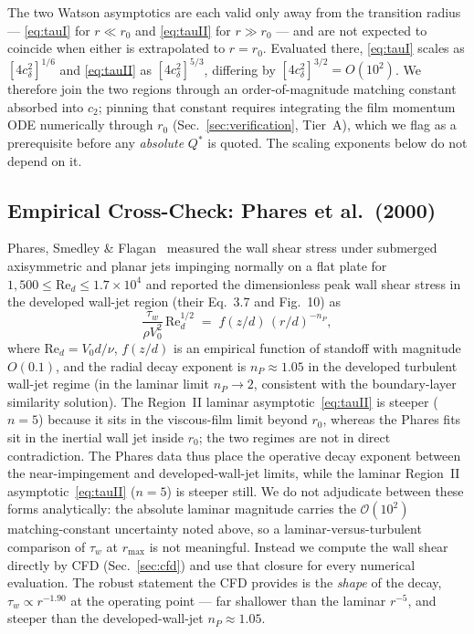 \documentclass[aps,prfluids,reprint,amsmath,amssymb,floatfix]{revtex4-2}
\newcommand{\Rey}{\mathrm{Re}}
\newcommand{\order}[1]{\mathcal{O}\!\left(#1\right)}
\begin{document}
The two Watson asymptotics are each valid only away from the transition radius ---
\eqref{eq:tauI} for $r \ll r_0$ and \eqref{eq:tauII} for $r \gg r_0$ --- and are not
expected to coincide when either is extrapolated to $r = r_0$. Evaluated there,
\eqref{eq:tauI} scales as $[4 c_\delta^2]^{1/6}$ and \eqref{eq:tauII} as
$[4 c_\delta^2]^{5/3}$, differing by $[4 c_\delta^2]^{3/2} = O(10^2)$. We therefore
join the two regions through an order-of-magnitude matching constant absorbed into
$c_2$; pinning that constant requires integrating the film momentum ODE numerically
through $r_0$ (Sec.~\ref{sec:verification}, Tier~A), which we flag as a prerequisite
before any \emph{absolute} $Q^*$ is quoted. The scaling exponents below do not depend
on it.

\subsection{Empirical Cross-Check: Phares et al.~(2000)}

Phares, Smedley \& Flagan~\citep{Phares2000} measured the wall shear
stress under submerged axisymmetric and planar jets impinging normally
on a flat plate for $1{,}500 \leq \Rey_d \leq 1.7\times 10^4$
and reported the dimensionless peak wall shear stress in the developed
wall-jet region (their Eq.~3.7 and Fig.~10) as
\begin{equation}
  \frac{\tau_w}{\rho V_0^2}\,\Rey_d^{1/2}
  \;=\; f(z/d)\,(r/d)^{-n_P},
  \label{eq:phares}
\end{equation}
where $\Rey_d = V_0 d/\nu$, $f(z/d)$ is an empirical function
of standoff with magnitude $O(0.1)$, and the radial decay exponent is
$n_P \approx 1.05$ in the developed turbulent wall-jet regime
(in the laminar limit $n_P \to 2$, consistent with the boundary-layer
similarity solution). The Region~II laminar
asymptotic~\eqref{eq:tauII} is steeper ($n = 5$) because it sits in
the viscous-film limit beyond $r_0$, whereas the Phares fits sit
in the inertial wall jet inside $r_0$; the two regimes
are not in direct contradiction. The Phares data thus place the operative
decay exponent between the near-impingement and developed-wall-jet limits,
while the laminar Region~II asymptotic~\eqref{eq:tauII} ($n = 5$) is steeper
still. We do not adjudicate between these forms analytically: the absolute
laminar magnitude carries the $\order{10^2}$ matching-constant uncertainty
noted above, so a laminar-versus-turbulent comparison of $\tau_w$ at
$r_\mathrm{max}$ is not meaningful. Instead we compute the wall shear directly
by CFD (Sec.~\ref{sec:cfd}) and use that closure for every numerical
evaluation. The robust statement the CFD provides is the \emph{shape} of the
decay, $\tau_w \propto r^{-1.90}$ at the operating point --- far shallower than
the laminar $r^{-5}$, and steeper than the developed-wall-jet $n_P \approx 1.05$.
\end{document}
